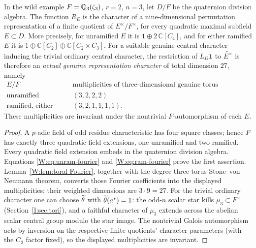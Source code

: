 \begin{proposition}\label{W:prop:all-three-tori}
In the wild example $F=\mathbb Q_3(\zeta_3)$, $r=2$, $n=3$,
let $D/F$ be the quaternion division algebra.  The function
$R_E$ is the character of a nine-dimensional permutation
representation of a finite quotient of $E^\times/F^\times$,
for every quadratic maximal subfield $E\subset D$.
More precisely, for unramified $E$ it is
$1\oplus 2\,\mathbb C[C_4]$, and for either ramified $E$
it is $1\oplus\mathbb C[C_2]\oplus\mathbb C[C_2\times C_3]$.
For a suitable genuine central character inducing the trivial
ordinary central character, the restriction of $L_D\mathbf1$
to $\widetilde{E^\times}$ is therefore an \emph{actual genuine
representation character} of total dimension $27$, namely
\[
 \begin{array}{c|c}
 E/F&\text{multiplicities of three-dimensional genuine torus irreducibles}\\\hline
 \text{unramified}&(3,2,2,2)\\
 \text{ramified, either type}&(3,2,1,1,1,1).
 \end{array}
\]
These multiplicities are invariant under the nontrivial
$F$-automorphism of each $E$.
\end{proposition}
\begin{proof}
A $p$-adic field of odd residue characteristic has four
square classes; hence $F$ has exactly three quadratic field
extensions, one unramified and two ramified.  Every quadratic
field extension embeds in the quaternion division algebra.
Equations \eqref{W:eq:unram-fourier} and \eqref{W:eq:ram-fourier}
prove the first assertion.  Lemma~\ref{W:lem:toral-Fourier},
together with the degree-three torus Stone--von Neumann theorem,
converts those Fourier coefficients into the displayed
multiplicities; their weighted dimensions are $3\cdot9=27$.
For the trivial ordinary character one can choose
$\widetilde\theta$ with $\widetilde\theta(a^*)=1$:
the odd-$n$ scalar star kills $\mu_3\subset F^\times$
(Section~\ref{I:sec:tori}), and a faithful character of
$\mu_3$ extends across the abelian scalar central group
modulo the star image.  The nontrivial Galois automorphism
acts by inversion on the respective finite quotients' character
parameters (with the $C_2$ factor fixed), so the displayed
multiplicities are invariant.
\end{proof}

